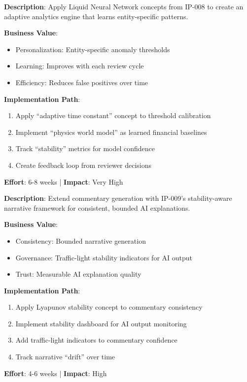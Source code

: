 \begin{tcolorbox}[colback=purple!5,colframe=purple!70,title=\faIcon{brain} Opportunity: Adaptive Analytics Engine (IP-008)]
\textbf{Description}: Apply Liquid Neural Network concepts from IP-008 to create an adaptive analytics engine that learns entity-specific patterns.

\textbf{Business Value}:
\begin{itemize}[nosep]
    \item Personalization: Entity-specific anomaly thresholds
    \item Learning: Improves with each review cycle
    \item Efficiency: Reduces false positives over time
\end{itemize}

\textbf{Implementation Path}:
\begin{enumerate}[nosep]
    \item Apply ``adaptive time constant'' concept to threshold calibration
    \item Implement ``physics world model'' as learned financial baselines
    \item Track ``stability'' metrics for model confidence
    \item Create feedback loop from reviewer decisions
\end{enumerate}

\textbf{Effort}: 6-8 weeks | \textbf{Impact}: Very High
\end{tcolorbox}

\begin{tcolorbox}[colback=orange!5,colframe=orange!70,title=\faIcon{book} Opportunity: Narrative Intelligence Module (IP-009)]
\textbf{Description}: Extend commentary generation with IP-009's stability-aware narrative framework for consistent, bounded AI explanations.

\textbf{Business Value}:
\begin{itemize}[nosep]
    \item Consistency: Bounded narrative generation
    \item Governance: Traffic-light stability indicators for AI output
    \item Trust: Measurable AI explanation quality
\end{itemize}

\textbf{Implementation Path}:
\begin{enumerate}[nosep]
    \item Apply Lyapunov stability concept to commentary consistency
    \item Implement stability dashboard for AI output monitoring
    \item Add traffic-light indicators to commentary confidence
    \item Track narrative ``drift'' over time
\end{enumerate}

\textbf{Effort}: 4-6 weeks | \textbf{Impact}: High
\end{tcolorbox}

